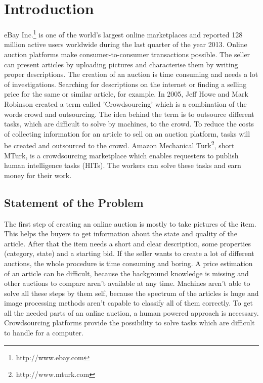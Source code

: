 \documentclass[a4paper]{report}
\begin{document}
  





\pagestyle{plain}
\newpage





\dominitoc
\tableofcontents
\newpage

\listoffigures

\listoftables

\lstlistoflistings

\chapter{Introduction}
eBay Inc.\footnote{http://www.ebay.com} is one of the world's largest online marketplaces and reported 128 million active users worldwide during the last quarter of the year 2013. Online auction platforms make consumer-to-consumer transactions possible. The seller can present articles by uploading pictures and characterise them by writing proper descriptions. The creation of an auction is time consuming and needs a lot of investigations. Searching for descriptions on the internet or finding a selling price for the same or similar article, for example. In 2005, Jeff Howe and Mark Robinson created a term called 'Crowdsourcing' which is a combination of the words crowd and outsourcing. The idea behind the term is to outsource different tasks, which are difficult to solve by machines, to the crowd. To reduce the costs of collecting information for an article to sell on an auction platform, tasks will be created and outsourced to the crowd. Amazon Mechanical Turk\footnote{http://www.mturk.com}, short MTurk, is a crowdsourcing marketplace which enables requesters to publish human intelligence tasks (HITs). The workers can solve these tasks and earn money for their work.

\section{Statement of the Problem}
The first step of creating an online auction is mostly to take pictures of the item. This helps the buyers to get information about the state and quality of the article. After that the item needs a short and clear description, some properties (category, state) and a starting bid. If the seller wants to create a lot of different auctions, the whole procedure is time consuming and boring. A price estimation of an article can be difficult, because the background knowledge is missing and other auctions to compare aren't available at any time. Machines aren't able to solve all these steps by them self, because the spectrum of the articles is huge and image processing methods aren't capable to classify all of them correctly. To get all the needed parts of an online auction, a human powered approach is necessary. Crowdsourcing platforms provide the possibility to solve tasks which are difficult to handle for a computer.
\end{document}
